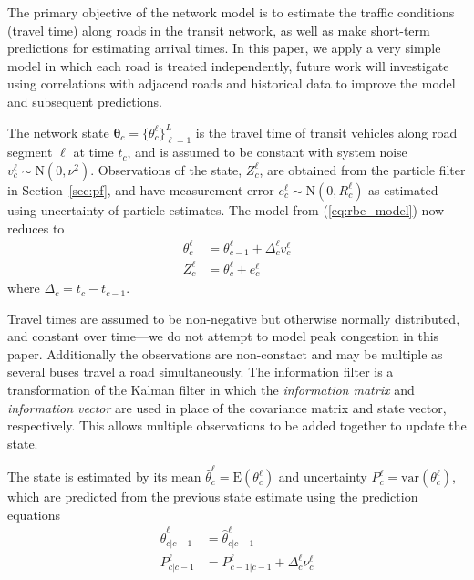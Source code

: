 The primary objective of the network model is to estimate the \rt traffic conditions
(travel time) along roads in the transit network, 
as well as make short-term predictions for estimating arrival times.
In this paper,  we apply a very simple model in which each road is treated independently,
future work will investigate using correlations with adjacend roads and historical data
to improve the model and subsequent predictions.


The network state $\boldsymbol\theta_c = \{\theta_c^\ell\}_{\ell = 1}^L$ is the travel time 
of transit vehicles along road segment $\ell$ at time $t_c$,
and is assumed to be constant with system noise $v_c^\ell \sim \mathrm{N}(0, \nu^2)$.
Observations of the state, $Z_c^\ell$, are obtained from the particle filter in Section~\ref{sec:pf},
and have measurement error $e_c^\ell \sim \mathrm{N}(0, R_c^\ell)$ as estimated 
using uncertainty of particle estimates.
The model from (\ref{eq:rbe_model}) now reduces to
\begin{equation}
\begin{split}
\theta_c^\ell &= \theta_{c-1}^\ell + \Delta_c^\ell v_c^\ell \\
Z_c^\ell &= \theta_c^\ell + e_c^\ell
\end{split}
\end{equation}
where $\Delta_c = t_c - t_{c-1}$.


Travel times are assumed to be non-negative but otherwise normally distributed,
and constant over time---we do not attempt to model peak congestion in this paper.
Additionally the observations are non-constact and may be multiple as several buses travel
a road simultaneously.
The information filter is a transformation of the Kalman filter in which the
\emph{information matrix} and \emph{information vector} are used in place of 
the covariance matrix and state vector, respectively.
This allows multiple observations to be added together to update the state.



The state is estimated by its mean $\hat \theta_c^\ell = \mathrm{E}(\theta_c^\ell)$
and uncertainty $P_c^\ell = \mathrm{var}(\theta_c^\ell)$,
which are predicted from the previous state estimate using the prediction
equations
\begin{align*}
\label{eq:kf_transition}
\hat \theta^\ell_{c|c-1} &= \hat \theta^\ell_{c|c-1} \\
P^\ell_{c|c-1} &= P^\ell_{c-1|c-1} + \Delta_c^\ell \nu_c^\ell
\end{align*}

